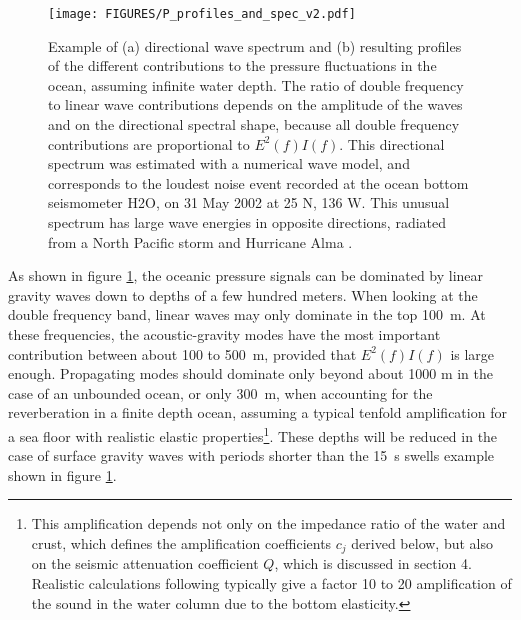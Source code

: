 \begin{figure}[htb]
\centerline{\texttt{[image: FIGURES/P\_profiles\_and\_spec\_v2.pdf]}}
  \caption{Example of (a) directional wave spectrum and (b) 
resulting profiles of the different contributions to the pressure fluctuations in the ocean, 
assuming infinite water depth. 
The ratio of double frequency 
to linear wave contributions depends on the amplitude of the waves and on the directional spectral shape, 
because all double 
frequency contributions are proportional to $E^2(f)I(f)$. This directional spectrum was estimated with a numerical wave model, 
and corresponds to the loudest noise 
event recorded at the ocean bottom seismometer H2O, on 31 May  2002 at 25 N, 136 W. This unusual spectrum 
 has large wave energies in opposite directions, radiated from 
a North Pacific storm and Hurricane Alma \citep[This event is analyzed in detail by][]{Obrebski&al.2012}.}
\label{fig:P_profiles}
\end{figure}

As shown in figure \ref{fig:P_profiles}, the oceanic pressure signals can be dominated by linear gravity waves down to 
depths of a few hundred
meters. When looking at the double frequency band, linear waves may only dominate in the top 100~m. 
At these frequencies, the acoustic-gravity modes have the 
most important contribution between about 100 to 500~m, provided that $E^2(f) I(f)$ is large enough. Propagating modes 
should dominate only beyond about 1000 m in the case of an unbounded ocean, or only 300~m, when 
accounting for the reverberation in a finite depth ocean, assuming a typical tenfold amplification for a sea floor with realistic elastic 
properties\footnote{This amplification depends not only on the impedance ratio of the water and crust, which defines 
the amplification coefficients $c_j$ derived below, but also on the seismic attenuation coefficient $Q$, which is discussed in section 4. Realistic calculations following \cite{Ardhuin&al.2011} typically give a
factor 10 to 20 amplification of the sound in the water column due to the bottom elasticity.}. These depths will be reduced in the case 
of surface gravity waves with periods  shorter than the 15~s swells example shown in figure  \ref{fig:P_profiles}.

